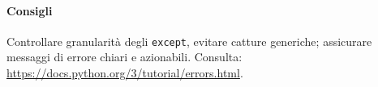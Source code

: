 \paragraph{Consigli} Controllare granularità degli \verb|except|, evitare catture generiche; assicurare messaggi di errore chiari e azionabili.
Consulta: \url{https://docs.python.org/3/tutorial/errors.html}.
